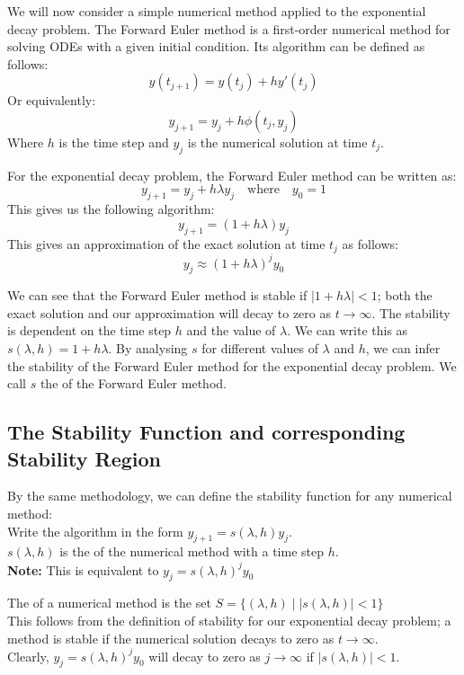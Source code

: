 \par We will now consider a simple numerical method applied to the exponential decay problem.
The Forward Euler method is a first-order numerical method for solving ODEs with a given initial condition.
Its algorithm can be defined as follows:
\[ y(t_{j+1}) = y(t_j) + h y'(t_j)\]
Or equivalently:
\[ y_{j+1} = y_j + h \phi(t_j, y_j)\]
Where $h$ is the time step and $y_j$ is the numerical solution at time $t_j$.

\par For the exponential decay problem, the Forward Euler method can be written as:
\[ y_{j+1} = y_j + h \lambda y_j \quad \text{where} \quad y_0 = 1\]
This gives us the following algorithm:
\[ y_{j+1} = (1 + h \lambda) y_j\]
This gives an approximation of the exact solution at time $t_j$ as follows:
\[ y_{j} \approx {(1 + h \lambda)}^j y_0\]

\par We can see that the Forward Euler method is stable if $|1 + h \lambda| < 1$; both the exact solution and our approximation will decay to zero as $t \rightarrow \infty$.
The stability is dependent on the time step $h$ and the value of $\lambda$.
We can write this as $s(\lambda, h) = 1 + h \lambda$.
By analysing $s$ for different values of $\lambda$ and $h$, we can infer the stability of the Forward Euler method for the exponential decay problem.
We call $s$ the  of the Forward Euler method.



\subsection{The Stability Function and corresponding Stability Region}
\par By the same methodology, we can define the stability function for any numerical method:\\
Write the algorithm in the form $y_{j+1} = s(\lambda, h) y_{j}$.\\
$s(\lambda, h)$ is the  of the numerical method with a time step $h$.\\
\textbf{Note:} This is equivalent to $y_{j} = {s(\lambda,h)}^{j} y_0$

\par The  of a numerical method is the set $S = \Big\{ (\lambda, h) \;\Big|\; |s(\lambda, h)| < 1\Big\}$\\
This follows from the definition of stability for our exponential decay problem; a method is stable if the numerical solution decays to zero as $t \rightarrow \infty$.\\
Clearly, $y_{j} = {s(\lambda,h)}^{j} y_0$ will decay to zero as $j \rightarrow \infty$ if $|s(\lambda, h)| < 1$.

